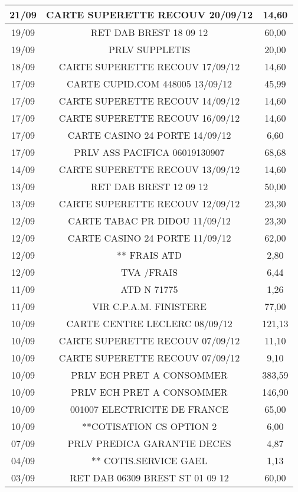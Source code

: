 \begin{longtable}{|c|c|c|}
\hline
21/09 & CARTE SUPERETTE RECOUV 20/09/12 & 14,60 \\
\hline
19/09 & RET DAB BREST          18 09 12 & 60,00 \\
\hline
19/09 & PRLV   SUPPLETIS & 20,00 \\
\hline
18/09 & CARTE SUPERETTE RECOUV 17/09/12 & 14,60 \\
\hline
17/09 & CARTE CUPID.COM 448005 13/09/12 & 45,99 \\
\hline
17/09 & CARTE SUPERETTE RECOUV 14/09/12 & 14,60 \\
\hline
17/09 & CARTE SUPERETTE RECOUV 16/09/12 & 14,60 \\
\hline
17/09 & CARTE CASINO 24 PORTE  14/09/12 & 6,60 \\
\hline
17/09 & PRLV   ASS PACIFICA  06019130907 & 68,68 \\
\hline
14/09 & CARTE SUPERETTE RECOUV 13/09/12 & 14,60 \\
\hline
13/09 & RET DAB BREST          12 09 12 & 50,00 \\
\hline
13/09 & CARTE SUPERETTE RECOUV 12/09/12 & 23,30 \\
\hline
12/09 & CARTE TABAC PR DIDOU   11/09/12 & 23,30 \\
\hline
12/09 & CARTE CASINO 24 PORTE  11/09/12 & 62,00 \\
\hline
12/09 & ** FRAIS ATD & 2,80 \\
\hline
12/09 & TVA /FRAIS & 6,44 \\
\hline
11/09 & ATD N 71775 & 1,26 \\
\hline
11/09 & VIR    C.P.A.M. FINISTERE & 77,00 \\
\hline
10/09 & CARTE CENTRE LECLERC   08/09/12 & 121,13 \\
\hline
10/09 & CARTE SUPERETTE RECOUV 07/09/12 & 11,10 \\
\hline
10/09 & CARTE SUPERETTE RECOUV 07/09/12 & 9,10 \\
\hline
10/09 & PRLV ECH PRET A CONSOMMER & 383,59 \\
\hline
10/09 & PRLV ECH PRET A CONSOMMER & 146,90 \\
\hline
10/09 & 001007 ELECTRICITE DE FRANCE & 65,00 \\
\hline
10/09 & **COTISATION CS OPTION 2 & 6,00 \\
\hline
07/09 & PRLV   PREDICA GARANTIE DECES & 4,87 \\
\hline
04/09 & ** COTIS.SERVICE GAEL & 1,13 \\
\hline
03/09 & RET DAB 06309 BREST ST 01 09 12 & 60,00 \\

\end{longtable}
